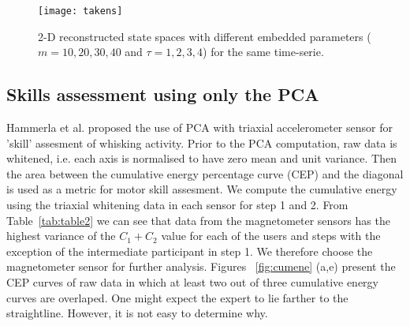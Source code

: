 \documentclass{sigchi}
\begin{document}
\begin{figure}[htbp!] 
\centering    
\texttt{[image: takens]}
\caption[PA]{2-D reconstructed state spaces with different embedded parameters ($m=10,20,30,40$ and $\tau= 1,2,3,4$)
for the same time-serie.}
\label{fig:takens_problem}
\end{figure}


\subsection{Skills assessment using only the PCA}
Hammerla et al. \cite{Hammerla2011} proposed the use of PCA with triaxial accelerometer sensor for 'skill' assesment 
of whisking activity. Prior to the PCA computation, raw data is whitened, i.e. each axis is normalised to have zero mean and unit variance.
Then the area between the cumulative energy percentage curve (CEP) and the diagonal is used as a metric for motor skill assesment.
We compute the cumulative energy using the triaxial whitening data in each sensor for step 1 and 2.
From Table~\ref{tab:table2} we can see that data from the magnetometer sensors has the highest variance 
of the $C_1 + C_2$ value for each of the users and steps with the exception of the intermediate participant in step 1. 
We therefore choose the magnetometer sensor for further analysis.
Figures ~\ref{fig:cumene} (a,e) present the CEP curves of raw data in which at least two out of three cumulative energy curves are overlaped. 
One might expect the expert to lie farther to the straightline. However, it is not easy to determine why.
\end{document}
